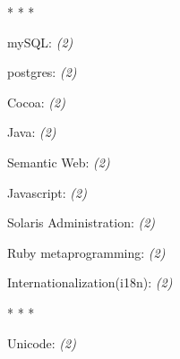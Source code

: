 \documentclass[]{article}
\begin{document}
       

 \begin{center}* * * \end{center}
 mySQL: \emph{(2)}
  \label{mysql2}

       

 postgres: \emph{(2)}
  \label{postgres2}

       

 Cocoa: \emph{(2)}
  \label{cocoa2}

       

 Java: \emph{(2)}
  \label{java2}

       

 Semantic Web: \emph{(2)}
  \label{semanticweb2}

       

 Javascript: \emph{(2)}
  \label{javascript2}

       

 Solaris Administration: \emph{(2)}
  \label{solarisadministration2}

       

 Ruby metaprogramming: \emph{(2)}
  \label{rubymetaprogramming2}

       

 Internationalization(i18n): \emph{(2)}
  \label{internationalization(i18n)2}

       

 \begin{center}* * * \end{center}
 Unicode: \emph{(2)}
  \label{unicode2}

       
\end{document}
